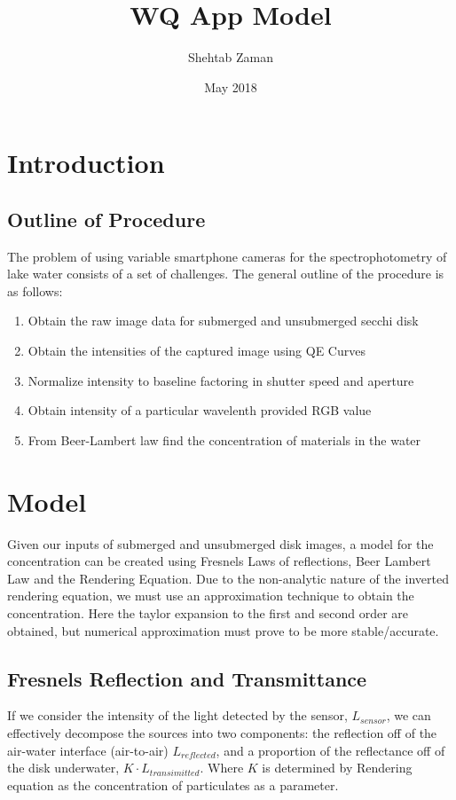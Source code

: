 \documentclass{article}
\title{WQ App Model}
\author{Shehtab Zaman }
\date{May 2018}
\begin{document}
\maketitle
\section{Introduction}

\subsection{Outline of Procedure}
The problem of using variable smartphone cameras for the
spectrophotometry of lake water consists of a set of challenges.
The general outline of the procedure is as follows:
\begin{enumerate}
\item Obtain the raw image data for submerged and unsubmerged secchi disk
\item Obtain the intensities of the captured image using QE Curves
\item Normalize intensity to baseline factoring in shutter speed and aperture
\item Obtain intensity of a particular wavelenth provided RGB value
\item From Beer-Lambert law find the concentration of materials in the water
\end{enumerate}

\section{Model}
Given our inputs of submerged and unsubmerged disk images, a model for the concentration
can be created using Fresnels Laws of reflections, Beer Lambert Law and the Rendering Equation.
Due to the non-analytic nature of the inverted rendering equation, we must use an approximation technique
to obtain the concentration. Here the taylor expansion to the first and  second order are obtained,
but numerical approximation must prove to be more stable/accurate.

\subsection{Fresnels Reflection and Transmittance}

If we consider the intensity of the light detected by the sensor, $ L_{sensor}$, we can
effectively decompose the sources into two components: the reflection off of the air-water
interface (air-to-air) $L_{reflected}$, and a proportion of the reflectance off of
the disk underwater, $K \cdot L_{transimitted}$. Where
$ K$ is determined by Rendering equation as the concentration of particulates as a parameter.
\end{document}
